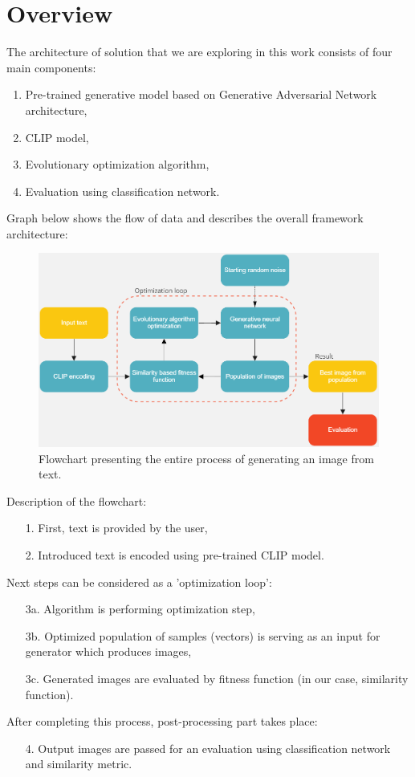 \documentclass[12pt,a4paper,openany]{book}
\begin{document}
\section{Overview}

\noindent The architecture of solution that we are exploring in this work consists of four main components:
\begin{enumerate}
\item Pre-trained generative model based on Generative Adversarial Network architecture,
\item CLIP model,
\item Evolutionary optimization algorithm,
\item Evaluation using classification network.
\end{enumerate}
Graph below shows the flow of data and describes the overall framework architecture:\\


\begin{figure}[H]
    \centering
    \includegraphics[scale=0.6]{figs/flow.png}
    \caption{Flowchart presenting the entire process of generating an image from text.}\label{Fig:flow}
\end{figure}

\noindent Description of the flowchart:
\begin{enumerate}
\item [1.] First, text is provided by the user,
\item [2.] Introduced text is encoded using pre-trained CLIP model.
\end{enumerate}
Next steps can be considered as a 'optimization loop':
\begin{enumerate}
\item [3a.] Algorithm is performing optimization step,
\item [3b.] Optimized population of samples (vectors)  is serving as an input for generator which produces images,
\item [3c.] Generated images are evaluated by fitness function (in our case, similarity function).
\end{enumerate}
\noindent After completing this process, post-processing part takes place:
\begin{enumerate}
\item [4.] Output images are passed for an evaluation using classification network and similarity metric.
\end{enumerate}
\end{document}

